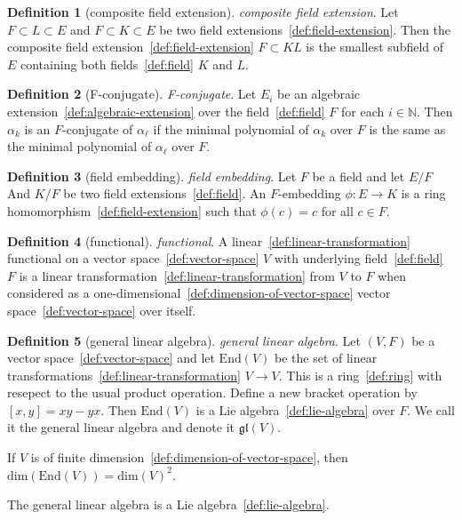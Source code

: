 \documentclass[12pt,a4paper]{article}
\theoremstyle{definition}
\newtheorem{definition}{Definition}
\begin{document}
\begin{definition}[composite field extension]\label{def:composite-field-extension}
\emph{composite field extension}. Let $F\subset L\subset E$ and $F\subset K\subset E$ be two field extensions~\ref{def:field-extension}. Then the composite field extension~\ref{def:field-extension} $F\subset KL$ is the smallest subfield of $E$ containing both fields~\ref{def:field} $K$ and $L$.
\end{definition}

\begin{definition}[F-conjugate]\label{def:f-conjugate}
\emph{F-conjugate}. Let $E_i$ be an algebraic extension~\ref{def:algebraic-extension} over the field~\ref{def:field} $F$ for each $i\in \mathbb N$. Then $\alpha_k$ is an $F$-conjugate of $\alpha_\ell$ if the minimal polynomial of $\alpha_k$ over $F$ is the same as the minimal polynomial of $\alpha_\ell$ over $F$.
\end{definition}

\begin{definition}[field embedding]\label{def:field-embedding}
\emph{field embedding}. Let $F$ be a field and let $E/F$ And $K/F$ be two field extensions~\ref{def:field}. An $F$-embedding $\phi:E\to K$ is a ring homomorphism~\ref{def:field-extension} such that $\phi(c) = c$ for all $c\in F$.
\end{definition}

\begin{definition}[functional]\label{def:functional}
\emph{functional}. A linear~\ref{def:linear-transformation} functional on a vector space~\ref{def:vector-space} $V$ with underlying field~\ref{def:field} $F$ is a linear transformation~\ref{def:linear-transformation} from $V$ to $F$ when considered as a one-dimensional~\ref{def:dimension-of-vector-space} vector space~\ref{def:vector-space} over itself.
\end{definition}

\begin{definition}[general linear algebra]\label{def:general-linear-algebra}
\emph{general linear algebra}. Let $(V,F)$ be a vector space~\ref{def:vector-space} and let $\text{End}(V)$ be the set of linear transformations~\ref{def:linear-transformation} $V\to V$. This is a ring~\ref{def:ring} with resepect to the usual product operation. Define a new bracket operation by $[x,y] = xy-yx$. Then $\text{End}(V)$ is a Lie algebra~\ref{def:lie-algebra} over $F$. We call it the general linear algebra and denote it $\mathfrak{gl}(V)$.

If $V$ is of finite dimension~\ref{def:dimension-of-vector-space}, then $\text{dim}(\text{End}(V)) = \text{dim}(V)^2$.

The general linear algebra is a Lie algebra~\ref{def:lie-algebra}.
\end{definition}
\end{document}
